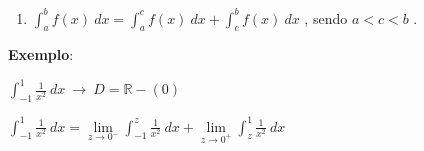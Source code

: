 			\begin{enumerate}[label=(P3)]
			
				\item {\LARGE $\int_{a}^{b} f(x) \ dx = \int_{a}^{c} f(x) \ dx + \int_{c}^{b} f(x) \ dx $ , sendo $ a < c < b $} .
		
			\end{enumerate}

			\medskip		

			\textbf{Exemplo}:

				\medskip

				$\int_{-1}^{1} \frac {1}{x^2} \ dx \ \longrightarrow \ D = \mathbb{R} - (0) $
			
				\bigskip
			
				$ \int_{-1}^{1} \frac {1}{x^2} \ dx = \lim \limits_{z \to 0^{-}} \int_{-1}^{z} \frac {1}{x^2} \ dx + \lim \limits_{z \to 0^{+}} \int_{z}^{1} \frac {1}{x^2} \ dx $